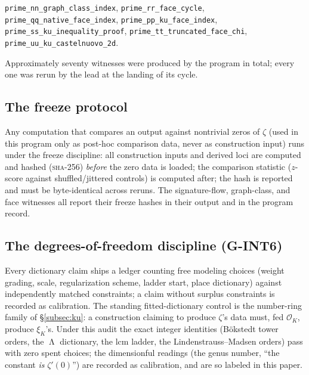 \documentclass[11pt,reqno]{amsart}
\theoremstyle{plain}
\theoremstyle{definition}
\theoremstyle{remark}
\DeclareMathOperator{\Lam}{\Lambda}
\begin{document}
\begin{itemize}
\texttt{prime\_\allowbreak nn\_\allowbreak graph\_\allowbreak class\_\allowbreak index}, \texttt{prime\_\allowbreak rr\_\allowbreak face\_\allowbreak cycle},
\texttt{prime\_\allowbreak qq\_\allowbreak native\_\allowbreak face\_\allowbreak index}, \texttt{prime\_\allowbreak pp\_\allowbreak ku\_\allowbreak face\_\allowbreak index},
\texttt{prime\_\allowbreak ss\_\allowbreak ku\_\allowbreak inequality\_\allowbreak proof}, \texttt{prime\_\allowbreak tt\_\allowbreak truncated\_\allowbreak face\_\allowbreak chi},
\texttt{prime\_\allowbreak uu\_\allowbreak ku\_\allowbreak castelnuovo\_\allowbreak 2d}.
\end{itemize}
Approximately seventy witnesses were produced by the program in total; every one was rerun
by the lead at the landing of its cycle.

\subsection*{The freeze protocol}
Any computation that compares an output against nontrivial zeros of $\zeta$ (used in this
program only as post-hoc comparison data, never as construction input) runs under the freeze
discipline: all construction inputs and derived loci are computed and hashed
(\textsc{sha-256}) \emph{before} the zero data is loaded; the comparison statistic ($z$-score
against shuffled/jittered controls) is computed after; the hash is reported and must be
byte-identical across reruns. The signature-flow, graph-class, and face witnesses all
report their freeze hashes in their output and in the program record.

\subsection*{The degrees-of-freedom discipline (G-INT6)}
Every dictionary claim ships a ledger counting free modeling choices (weight grading, scale,
regularization scheme, ladder start, place dictionary) against independently matched
constraints; a claim without surplus constraints is recorded as calibration. The standing
fitted-dictionary control is the number-ring family of \S\ref{subsec:ku}: a construction
claiming to produce $\zeta$'s data must, fed $\mathcal{O}_K$, produce $\xi_K$'s. Under this
audit the exact integer identities (B\"okstedt tower orders, the $\Lam$ dictionary, the
$\mathrm{lcm}$ ladder, the Lindenstrauss--Madsen orders) pass with zero spent choices; the
dimensionful readings (the genus number, ``the constant \emph{is} $\zeta'(0)$'') are
recorded as calibration, and are so labeled in this paper.
\end{document}
